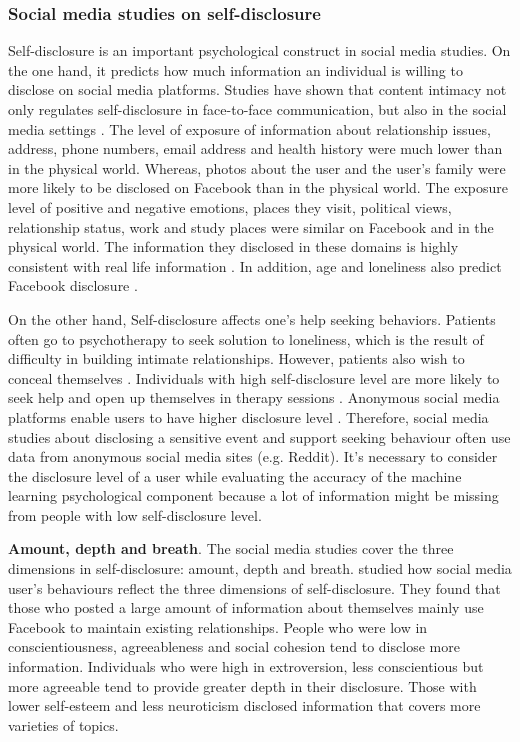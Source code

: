 \subsubsection{Social media studies on self-disclosure}
Self-disclosure is an important psychological construct in social media studies. On the one hand, it predicts how much information an individual is willing to disclose on social media platforms. Studies have shown that content intimacy not only regulates self-disclosure in face-to-face communication, but also in the social media settings \cite{ma_anonymity_2016}. The level of exposure of information about relationship issues, address, phone numbers, email address and health history were much lower than in the physical world. Whereas, photos about the user and the user's family were more likely to be disclosed on Facebook than in the physical world. The exposure level of positive and negative emotions, places they visit, political views, relationship status, work and study places were similar on Facebook and in the physical world. The information they disclosed in these domains is highly consistent with real life information \cite{villela2015contrasting}. In addition, age and loneliness also predict Facebook disclosure \cite{malik2016uses}. 


On the other hand, Self-disclosure affects one's help seeking behaviors. Patients often go to psychotherapy to seek solution to loneliness, which is the result of difficulty in building intimate relationships. However, patients also wish to conceal themselves \cite{fisher1990shared, stricker1990self}.  Individuals with high self-disclosure level are more likely to seek help and open up themselves in therapy sessions \cite{hinson1993willingness}. Anonymous social media platforms enable users to have higher disclosure level \cite{andalibi_announcing_2018}. Therefore, social media studies about disclosing a sensitive event and support seeking behaviour often use data from anonymous social media sites (e.g. Reddit). It's necessary to consider the disclosure level of a user while evaluating the accuracy of the machine learning psychological component because a lot of information might be missing from people with low self-disclosure level.


\textbf{Amount, depth and breath}. The social media studies cover the three dimensions in self-disclosure: amount, depth and breath.  \citet{hollenbaugh_facebook_2014} studied how social media user's behaviours reflect the three dimensions of self-disclosure. They found that those who posted a large amount of information about themselves mainly use Facebook to maintain existing relationships. People who were low in conscientiousness, agreeableness and social cohesion tend to disclose more information. Individuals who were high in extroversion, less conscientious but more agreeable tend to provide greater depth in their disclosure. Those with lower self-esteem and less neuroticism disclosed information that covers more varieties of topics. 


